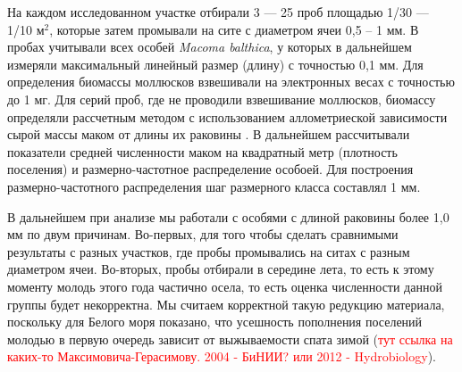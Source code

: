 \documentclass[12pt, a4paper]{article}
\begin{document}
На каждом исследованном участке отбирали 3 --- 25 проб площадью 1/30 --- 1/10 м$^2$, которые затем промывали на сите с диаметром ячеи 0,5 -- 1 мм. 
В пробах учитывали всех особей {\it Macoma balthica}, у которых в дальнейшем измеряли максимальный линейный размер (длину) с точностью 0,1 мм. 
Для определения биомассы моллюсков взвешивали на электронных весах с точностью до 1 мг. Для серий проб, где не проводили взвешивание моллюсков, биомассу определяли рассчетным методом с использованием аллометриеской зависимости сырой массы маком от длины их раковины \cite{Maximovich_et_al_1993}.
В дальнейшем рассчитывали показатели средней численности маком на квадратный метр (плотность поселения) и размерно-частотное распределение особоей.
Для построения размерно-частотного распределения шаг размерного класса составлял 1 мм.


В дальнейшем при анализе мы работали с особями с длиной раковины более 1,0 мм по двум причинам. 
Во-первых, для того чтобы сделать сравнимыми результаты с разных участков, где пробы промывались на ситах с разным диаметром ячеи. 
Во-вторых, пробы отбирали в середине лета, то есть к этому моменту молодь этого года частично осела, то есть оценка численности данной группы будет некорректна.
Мы считаем корректной такую редукцию материала, поскольку для Белого моря показано, что усешность пополнения поселений молодью в первую очередь зависит от выжываемости спата зимой (\textcolor{red}{тут ссылка на каких-то Максимовича-Герасимову. 2004 - БиНИИ? или 2012 - Hydrobiology}).





 
\end{document}

